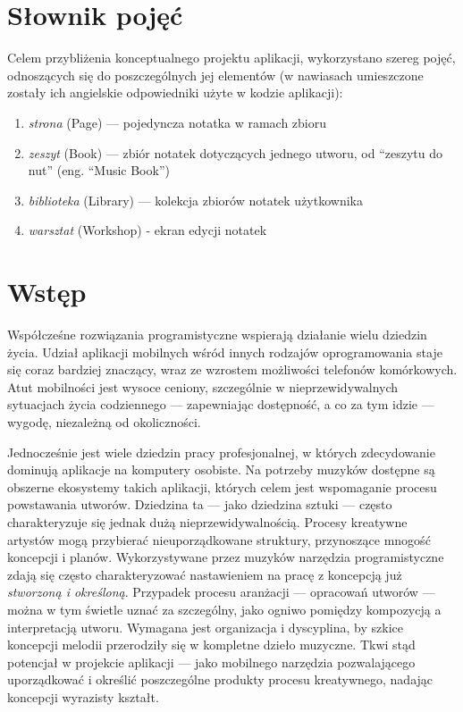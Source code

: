 \documentclass[12pt]{article}
\begin{document}
\newpage
\clearpage
\tableofcontents


\newpage
{}
\section*{Słownik pojęć}
Celem przybliżenia konceptualnego projektu aplikacji, wykorzystano szereg pojęć, odnoszących się do poszczególnych jej
elementów (w nawiasach umieszczone zostały ich angielskie odpowiedniki użyte w kodzie aplikacji):
\begin{enumerate}
	\item \textit{strona} (Page) — pojedyncza notatka w ramach zbioru
	\item \textit{zeszyt} (Book) — zbiór notatek dotyczących jednego utworu, od \enquote{zeszytu do nut} (eng. \enquote{Music Book})
	\item \textit{biblioteka} (Library) — kolekcja zbiorów notatek użytkownika
	\item \textit{warsztat} (Workshop) - ekran edycji notatek
\end{enumerate}

\newpage
{}
\section*{Wstęp}
Współcześne rozwiązania programistyczne wspierają działanie wielu dziedzin życia.
Udział aplikacji mobilnych wśród innych rodzajów oprogramowania staje się coraz bardziej znaczący,
wraz ze wzrostem możliwości telefonów komórkowych.
Atut mobilności jest wysoce ceniony, szczególnie w nieprzewidywalnych sytuacjach życia codziennego
— zapewniając dostępność, a co za tym idzie — wygodę, niezależną od okoliczności.

Jednocześnie jest wiele dziedzin pracy profesjonalnej, w których zdecydowanie dominują aplikacje na komputery osobiste.
Na potrzeby muzyków dostępne są obszerne ekosystemy takich aplikacji, których celem jest wspomaganie procesu powstawania utworów.
Dziedzina ta — jako dziedzina sztuki — często charakteryzuje się jednak dużą nieprzewidywalnością.
Procesy kreatywne artystów mogą przybierać nieuporządkowane struktury, przynoszące mnogość koncepcji i planów.
Wykorzystywane przez muzyków narzędzia programistyczne zdają się często charakteryzować nastawieniem na pracę
z koncepcją już \textit{stworzoną i określoną}.
Przypadek procesu aranżacji — opracowań utworów — można w tym świetle uznać za szczególny, jako ogniwo pomiędzy kompozycją
a interpretacją utworu. Wymagana jest organizacja i dyscyplina, by szkice koncepcji melodii przerodziły się w kompletne
dzieło muzyczne. Tkwi stąd potencjał w projekcie aplikacji — jako mobilnego narzędzia pozwalającego uporządkować i określić
poszczególne produkty procesu kreatywnego, nadając koncepcji wyrazisty kształt.
\end{document}
